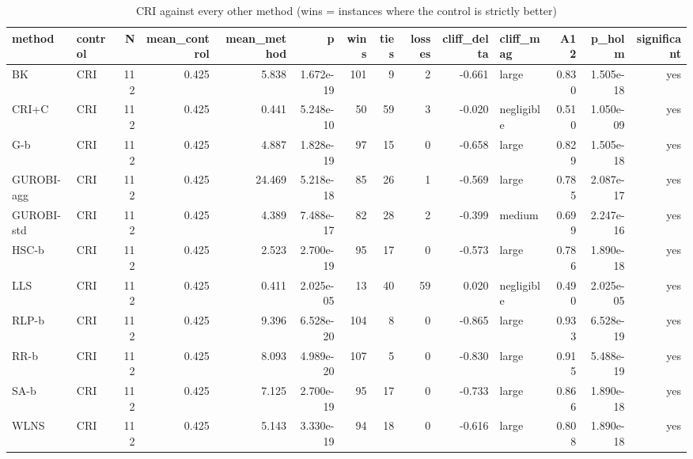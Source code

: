 \begin{table}[htbp]
\centering
\small
\caption{CRI against every other method (wins = instances where the control is strictly better)}
\label{tab:E4a_equal_budgets_b1_vs_CRI}
\begin{tabular}{llrrrrrrrrlrrr}
\toprule
method & control & N & mean\_control & mean\_method & p & wins & ties & losses & cliff\_delta & cliff\_mag & A12 & p\_holm & significant \\
\midrule
BK & CRI & 112 & 0.425 & 5.838 & 1.672e-19 & 101 & 9 & 2 & -0.661 & large & 0.830 & 1.505e-18 & yes \\
CRI+C & CRI & 112 & 0.425 & 0.441 & 5.248e-10 & 50 & 59 & 3 & -0.020 & negligible & 0.510 & 1.050e-09 & yes \\
G-b & CRI & 112 & 0.425 & 4.887 & 1.828e-19 & 97 & 15 & 0 & -0.658 & large & 0.829 & 1.505e-18 & yes \\
GUROBI-agg & CRI & 112 & 0.425 & 24.469 & 5.218e-18 & 85 & 26 & 1 & -0.569 & large & 0.785 & 2.087e-17 & yes \\
GUROBI-std & CRI & 112 & 0.425 & 4.389 & 7.488e-17 & 82 & 28 & 2 & -0.399 & medium & 0.699 & 2.247e-16 & yes \\
HSC-b & CRI & 112 & 0.425 & 2.523 & 2.700e-19 & 95 & 17 & 0 & -0.573 & large & 0.786 & 1.890e-18 & yes \\
LLS & CRI & 112 & 0.425 & 0.411 & 2.025e-05 & 13 & 40 & 59 & 0.020 & negligible & 0.490 & 2.025e-05 & yes \\
RLP-b & CRI & 112 & 0.425 & 9.396 & 6.528e-20 & 104 & 8 & 0 & -0.865 & large & 0.933 & 6.528e-19 & yes \\
RR-b & CRI & 112 & 0.425 & 8.093 & 4.989e-20 & 107 & 5 & 0 & -0.830 & large & 0.915 & 5.488e-19 & yes \\
SA-b & CRI & 112 & 0.425 & 7.125 & 2.700e-19 & 95 & 17 & 0 & -0.733 & large & 0.866 & 1.890e-18 & yes \\
WLNS & CRI & 112 & 0.425 & 5.143 & 3.330e-19 & 94 & 18 & 0 & -0.616 & large & 0.808 & 1.890e-18 & yes \\
\bottomrule
\end{tabular}
\end{table}
